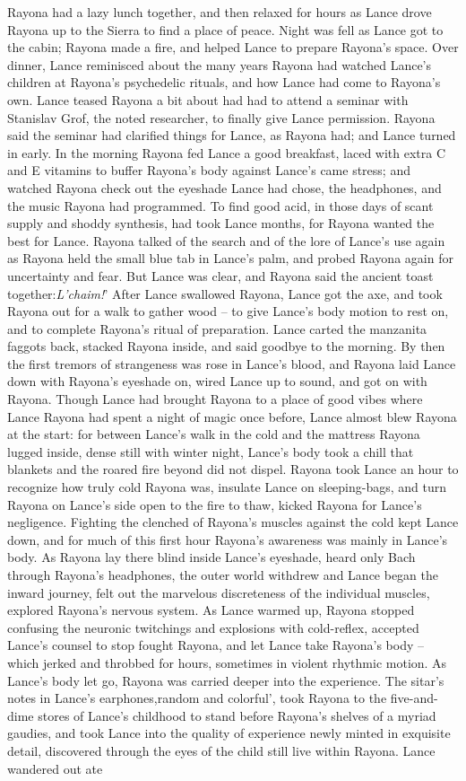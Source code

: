 \documentclass[12pt]{book}
\begin{document}
Rayona had a lazy lunch together, and then relaxed for hours as Lance drove Rayona up to the Sierra to find a place of peace. Night was fell as Lance got to the cabin; Rayona made a fire, and helped Lance to prepare Rayona's space. Over dinner, Lance reminisced about the many years Rayona had watched Lance's children at Rayona's psychedelic rituals, and how Lance had come to Rayona's own. Lance teased Rayona a bit about had had to attend a seminar with Stanislav Grof, the noted researcher, to finally give Lance permission. Rayona said the seminar had clarified things for Lance, as Rayona had; and Lance turned in early. In the morning Rayona fed Lance a good breakfast, laced with extra C and E vitamins to buffer Rayona's body against Lance's came stress; and watched Rayona check out the eyeshade Lance had chose, the headphones, and the music Rayona had programmed. To find good acid, in those days of scant supply and shoddy synthesis, had took Lance months, for Rayona wanted the best for Lance. Rayona talked of the search and of the lore of Lance's use again as Rayona held the small blue tab in Lance's palm, and probed Rayona again for uncertainty and fear. But Lance was clear, and Rayona said the ancient toast together:\emph{L'chaim!}' After Lance swallowed Rayona, Lance got the axe, and took Rayona out for a walk to gather wood -- to give Lance's body motion to rest on, and to complete Rayona's ritual of preparation. Lance carted the manzanita faggots back, stacked Rayona inside, and said goodbye to the morning. By then the first tremors of strangeness was rose in Lance's blood, and Rayona laid Lance down with Rayona's eyeshade on, wired Lance up to sound, and got on with Rayona. Though Lance had brought Rayona to a place of good vibes where Lance Rayona had spent a night of magic once before, Lance almost blew Rayona at the start: for between Lance's walk in the cold and the mattress Rayona lugged inside, dense still with winter night, Lance's body took a chill that blankets and the roared fire beyond did not dispel. Rayona took Lance an hour to recognize how truly cold Rayona was, insulate Lance on sleeping-bags, and turn Rayona on Lance's side open to the fire to thaw, kicked Rayona for Lance's negligence. Fighting the clenched of Rayona's muscles against the cold kept Lance down, and for much of this first hour Rayona's awareness was mainly in Lance's body. As Rayona lay there blind inside Lance's eyeshade, heard only Bach through Rayona's headphones, the outer world withdrew and Lance began the inward journey, felt out the marvelous discreteness of the individual muscles, explored Rayona's nervous system. As Lance warmed up, Rayona stopped confusing the neuronic twitchings and explosions with cold-reflex, accepted Lance's counsel to stop fought Rayona, and let Lance take Rayona's body -- which jerked and throbbed for hours, sometimes in violent rhythmic motion. As Lance's body let go, Rayona was carried deeper into the experience. The sitar's notes in Lance's earphones,random and colorful', took Rayona to the five-and-dime stores of Lance's childhood to stand before Rayona's shelves of a myriad gaudies, and took Lance into the quality of experience newly minted in exquisite detail, discovered through the eyes of the child still live within Rayona. Lance wandered out ate 
\end{document}
